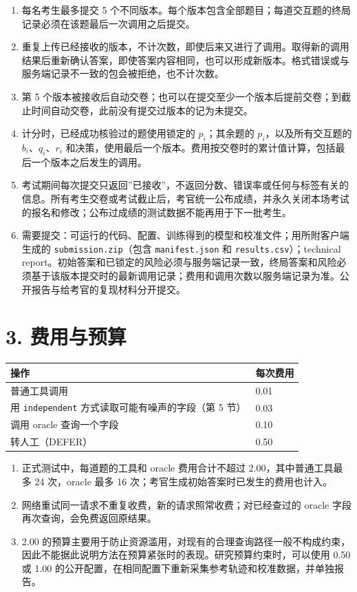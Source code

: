 \documentclass[11pt,a4paper]{article}
\newcounter{none} %
\providecommand{\tightlist}{\setlength{\itemsep}{3pt}\setlength{\parskip}{0pt}}
\begin{document}
\begin{enumerate}
\def\labelenumi{\arabic{enumi}.}
\tightlist
\item
  每名考生最多提交 5
  个不同版本。每个版本包含全部题目；每道交互题的终局记录必须在该题最后一次调用之后提交。
\item
  重复上传已经接收的版本，不计次数，即使后来又进行了调用。取得新的调用结果后重新确认答案，即使答案内容相同，也可以形成新版本。格式错误或与服务端记录不一致的包会被拒绝，也不计次数。
\item
  第 5
  个版本被接收后自动交卷；也可以在提交至少一个版本后提前交卷；到截止时间自动交卷，此前没有提交过版本的记为未提交。
\item
  计分时，已经成功核验过的题使用锁定的 \(p_i\)；其余题的
  \(p_i\)，以及所有交互题的 \(b_i\)、\(q_i\)、\(r_i\)
  和决策，使用最后一个版本。费用按交卷时的累计值计算，包括最后一个版本之后发生的调用。
\item
  考试期间每次提交只返回''已接收''，不返回分数、错误率或任何与标签有关的信息。所有考生交卷或考试截止后，考官统一公布成绩，并永久关闭本场考试的报名和修改；公布过成绩的测试数据不能再用于下一批考生。
\item
  需要提交：可运行的代码、配置、训练得到的模型和校准文件；用所附客户端生成的
  \texttt{submission.zip}（包含 \texttt{manifest.json} 和
  \texttt{results.csv}）；technical
  report。初始答案和已锁定的风险必须与服务端记录一致，终局答案和风险必须基于该版本提交时的最新调用记录；费用和调用次数以服务端记录为准。公开报告与给考官的复现材料分开提交。
\end{enumerate}

\section{3. 费用与预算}\label{ux8d39ux7528ux4e0eux9884ux7b97}

{\small{} %
\begin{longtable}[]{@{}ll@{}}
\toprule\noalign{}
操作 & 每次费用 \\
\midrule\noalign{}
\endhead
\bottomrule\noalign{}
\endlastfoot
普通工具调用 & 0.01 \\
用 \texttt{independent} 方式读取可能有噪声的字段（第 5 节） & 0.03 \\
调用 oracle 查询一个字段 & 0.10 \\
转人工（DEFER） & 0.50 \\
\end{longtable}
}

\begin{enumerate}
\def\labelenumi{\arabic{enumi}.}
\tightlist
\item
  正式测试中，每道题的工具和 oracle 费用合计不超过
  2.00，其中普通工具最多 24 次，oracle 最多 16
  次；考官生成初始答案时已发生的费用也计入。
\item
  网络重试同一请求不重复收费，新的请求照常收费；对已经查过的 oracle
  字段再次查询，会免费返回原结果。
\item
  2.00
  的预算主要用于防止资源滥用，对现有的合理查询路径一般不构成约束，因此不能据此说明方法在预算紧张时的表现。研究预算约束时，可以使用
  0.50 或 1.00
  的公开配置，在相同配置下重新采集参考轨迹和校准数据，并单独报告。
\end{enumerate}
\end{document}
